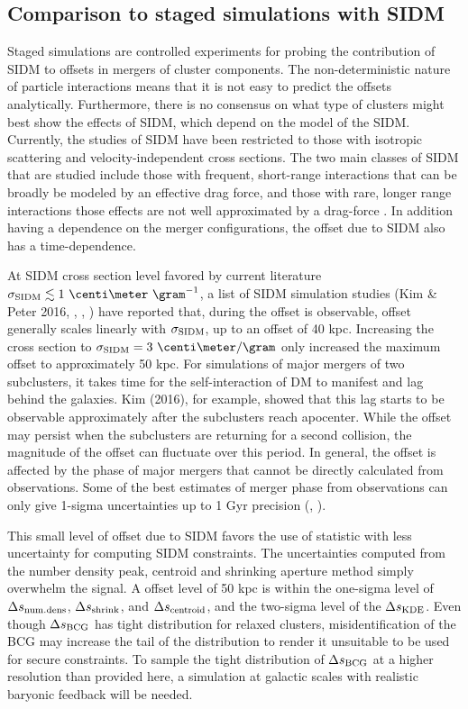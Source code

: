   
\subsection{Comparison to staged simulations with SIDM}
\label{subsec:SIDM_sim}
Staged simulations are controlled experiments for probing the contribution
of SIDM to offsets in mergers of cluster components. 
The non-deterministic nature of particle interactions means that it is not easy
to predict the offsets analytically.
Furthermore, there is no consensus on what type of clusters might best show the
effects of SIDM, which depend on the model of the SIDM.
Currently, the studies of SIDM have been restricted to those with isotropic
scattering and velocity-independent cross sections.   
The two main classes of SIDM that are studied include those with 
frequent, short-range interactions that can be broadly be modeled by an
effective drag force, and those with rare, longer range interactions those
effects are not well approximated by a drag-force \citep{Kahlhoefer14}. 
In addition having a dependence on the merger configurations, the offset due to
SIDM also has a time-dependence.    

At SIDM cross section level favored by current literature $\sigmaSIDM
\lesssim 1~\centi\meter ~\gram^{-1}$, a list of SIDM simulation studies (Kim \&
Peter 2016, \citealt{Robertson2016}, \citealt{Kahlhoefer14}, \citealt{Randall2008d})
have reported that, during the offset is observable, 
offset generally scales linearly with $\sigma_{\rm SIDM}$,  
up to an offset of 40 kpc.  Increasing the cross section to $\sigmaSIDM = 3
~\centi\meter / \gram$ only increased the maximum offset to approximately 50 kpc.
For simulations of major mergers of two subclusters, it takes time for the self-interaction of DM
to manifest and lag behind the galaxies. Kim  (2016), for example, showed that
this lag starts to be observable approximately after the subclusters reach apocenter. 
While the offset may persist when the subclusters are returning for a
second collision, the magnitude of the offset can fluctuate over this period.
In general, the offset is affected by the phase of major mergers that cannot be
directly calculated from observations. Some of the best estimates of merger
phase from observations
can only give 1-sigma uncertainties up
to 1 Gyr precision (\citealt{D13}, \citealt{Ng2014}).

This small level of offset due to SIDM favors the use of statistic 
with less uncertainty for computing SIDM constraints. 
The uncertainties computed from the number density peak, centroid and shrinking
aperture method simply overwhelm the signal. 
A offset level of 50 kpc is within the one-sigma level of $\Delta s_{\rm num.
dens}$, $\Delta s_{\rm shrink}$, and $\Delta s_{\rm centroid}$, and the two-sigma
level of the $\Delta s_{\rm KDE}$. 
Even though $\Delta s_{\rm BCG}$ has tight distribution for relaxed clusters, misidentification of the BCG 
may increase the tail of the distribution to render it unsuitable to be used 
for secure constraints. To sample the tight distribution of $\Delta s_{\rm
BCG}$ at a higher
resolution than provided here, a simulation at galactic scales with realistic
baryonic feedback will be needed. 

